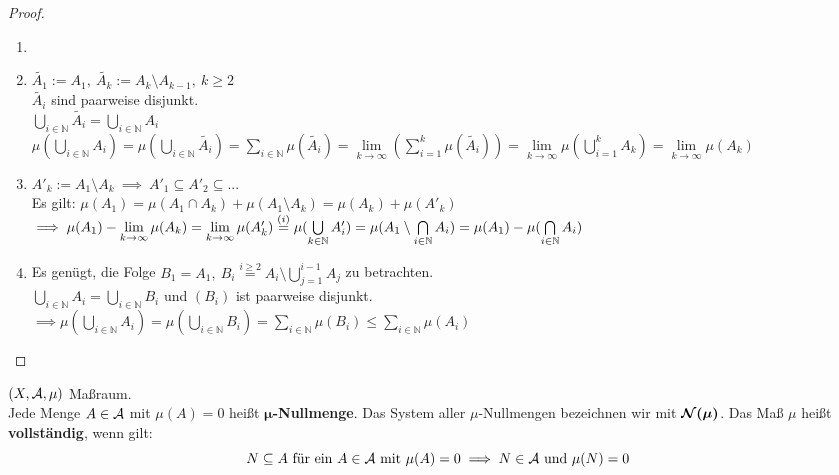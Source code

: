   \begin{proof}
    \begin{enumerate}[label=(\roman*)]
      \item[]
      \item $\tilde{A_1} := A_1, \ \tilde{A_k} := A_k \setminus A_{k-1}, \ k \geq 2$\\
            $\tilde{A_i}$ sind paarweise disjunkt.\\
            $\bigcup\limits_{i \in \mathbb{N}} \tilde{A_i} = \bigcup\limits_{i \in \mathbb{N}} A_i$\\
            $\mu(\bigcup\limits_{i \in \mathbb{N}} A_i) = \mu(\bigcup\limits_{i \in \mathbb{N}} \tilde{A_i}) = \sum\limits_{i \in \mathbb{N}} \mu(\tilde{A_i}) = \lim\limits_{k \to \infty}(\sum\limits_{i=1}^k \mu(\tilde{A_i})) = \lim\limits_{k \to \infty} \mu(\bigcup\limits_{i=1}^k A_k) = \lim\limits_{k \to \infty} \mu(A_k)$
      \item $A'_k := A_1 \setminus A_k \ \implies \ A'_1 \subseteq A'_2 \subseteq ...$\\
            Es gilt: $\mu(A_1) = \mu(A_1 \cap A_k) + \mu(A_1 \setminus A_k) = \mu(A_k) + \mu(A'_k)$\\
            $\implies \mu(A_1) - \lim\limits_{k \to \infty} \mu(A_k) = \lim\limits_{k \to \infty} \mu(A'_k) \stackrel{(i)}{=} \mu(\bigcup\limits_{k \in \mathbb{N}} A'_i) = \mu(A_1 \setminus \bigcap\limits_{i \in \mathbb{N}}A_i)\\ = \mu(A_1) - \mu(\bigcap\limits_{i \in \mathbb{N}} A_i)$
      \item Es genügt, die Folge $B_1 = A_1,\ B_i \stackrel{i \geq 2}{=} A_i \setminus \bigcup\limits_{j=1}^{i-1}A_j$ zu betrachten.\\
            $\bigcup\limits_{i \in \mathbb{N}} A_i = \bigcup\limits_{i \in \mathbb{N}} B_i$ und $(B_i)$ ist paarweise disjunkt.\\
            $\implies \mu(\bigcup\limits_{i \in \mathbb{N}} A_i) = \mu(\bigcup\limits_{i \in \mathbb{N}} B_i) = \sum\limits_{i \in \mathbb{N}} \mu(B_i) \leq \sum\limits_{i \in \mathbb{N}} \mu(A_i)$
    \end{enumerate}
  \end{proof}

  \begin{definition}
    $(X, \mathcal{A}, \mu)$ Maßraum.\\
    Jede Menge $A \in \mathcal{A}$ mit $\mu(A) = 0$ heißt $\bm{\mu}$\textbf{-Nullmenge}. Das System aller $\mu$-Nullmengen bezeichnen wir mit $\bm{\mathcal{N}(\mu)}$. Das Maß $\mu$ heißt \textbf{vollständig}, wenn gilt:\\
    \[
      N \subseteq A \text{ für ein } A \in \mathcal{A} \text{ mit } \mu(A)=0\\
      \implies N \in \mathcal{A} \text{ und } \mu(N)=0
    \]
  \end{definition}


